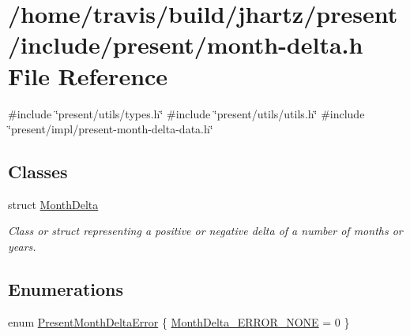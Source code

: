 \hypertarget{month-delta_8h}{\section{/home/travis/build/jhartz/present/include/present/month-\/delta.h \-File \-Reference}
\label{month-delta_8h}
}
{\ttfamily \#include \char`\"{}present/utils/types.\-h\char`\"{}}\*
{\ttfamily \#include \char`\"{}present/utils/utils.\-h\char`\"{}}\*
{\ttfamily \#include \char`\"{}present/impl/present-\/month-\/delta-\/data.\-h\char`\"{}}\*
\subsection*{\-Classes}
\begin{DoxyCompactItemize}
\item 
struct \hyperlink{structMonthDelta}{\-Month\-Delta}
\begin{DoxyCompactList}\small\item\em \-Class or struct representing a positive or negative delta of a number of months or years. \end{DoxyCompactList}\end{DoxyCompactItemize}
\subsection*{\-Enumerations}
\begin{DoxyCompactItemize}
\item 
enum \hyperlink{month-delta_8h_aee28c4c9b4054448713e954a7944cb51}{\-Present\-Month\-Delta\-Error} \{ \hyperlink{month-delta_8h_aee28c4c9b4054448713e954a7944cb51a880d48faec79524a948ad81b1ab2e87e}{\-Month\-Delta\-\_\-\-E\-R\-R\-O\-R\-\_\-\-N\-O\-N\-E} =  0
 \}
\end{DoxyCompactItemize}
